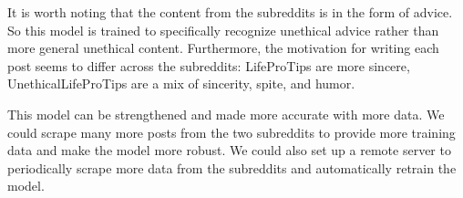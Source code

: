 \documentclass{amsart}
\theoremstyle{definition}
\theoremstyle{remark}
\begin{document}
It is worth noting that the content from the subreddits is in the form of advice.  So this model is trained to specifically recognize unethical advice rather than more general unethical content.  Furthermore, the motivation for writing each post seems to differ across the subreddits: LifeProTips are more sincere, UnethicalLifeProTips are a mix of sincerity, spite, and humor.

This model can be strengthened and made more accurate with more data.  We could scrape many more posts from the two subreddits to provide more training data and make the model more robust.  We could also set up a remote server to periodically scrape more data from the subreddits and automatically retrain the model.

\end{document}
